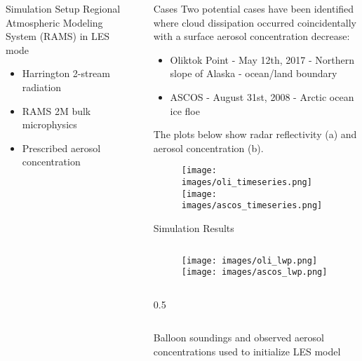 \documentclass[final]{beamer}
\newlength{\sepwid}
\newlength{\onecolwid}
\newlength{\twocolwid}
\begin{document}
\begin{frame}[t]
\begin{columns}[t]
\begin{column}{\onecolwid}
	\begin{block}{Simulation Setup}
		Regional Atmospheric Modeling System (RAMS) in LES mode
		\begin{itemize}
			\item Harrington 2-stream radiation
			\item RAMS 2M bulk microphysics
			\item Prescribed aerosol concentration
		\end{itemize}
	\end{block}

\end{column} %

\begin{column}{\sepwid}\end{column} %

\begin{column}{\twocolwid}
	\begin{block}{Cases}
		Two potential cases have been identified where cloud dissipation occurred coincidentally with a surface aerosol concentration decrease:
		\begin{itemize}
			\item Oliktok Point - May 12th, 2017 - Northern slope of Alaska - ocean/land boundary
			\item ASCOS - August 31st, 2008 - Arctic ocean ice floe
		\end{itemize}
		
		The plots below show radar reflectivity (a) and aerosol concentration (b).
		\begin{figure}
			\texttt{[image: images/oli\_timeseries.png]}
			\texttt{[image: images/ascos\_timeseries.png]}

		\end{figure}
	\end{block}

	\begin{alertblock}{Simulation Results}
		\begin{column}{0.59\linewidth}
			\begin{figure}
				\centering
				\texttt{[image: images/oli\_lwp.png]}
				\texttt{[image: images/ascos\_lwp.png]}
			\end{figure}
		\end{column}
		\begin{column}{0.5\sepwid}\end{column}
		\begin{column}{0.39\linewidth}
			Balloon soundings and observed aerosol concentrations used to initialize LES model
			\vspace{0.1 em}


\end{column}
\end{alertblock}
\end{column}
\end{columns}
\end{frame}
\end{document}
